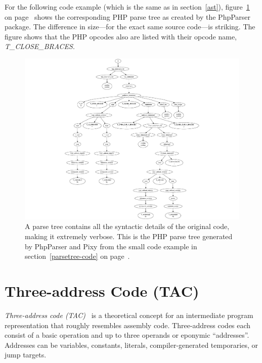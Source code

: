 For the following code example (which is the same as in section~\ref{ast}), figure~\ref{fig:parse-tree} on page~\pageref{fig:parse-tree} shows the corresponding PHP parse tree as created by the PhpParser package. The difference in size---for the exact same source code---is striking. The figure shows that the PHP opcodes also are listed with their opcode name, \eg \emph{T\_CLOSE\_BRACES}.

\label{parsetree-code}

\begin{figure}[htb]
  \begin{center}
    \includegraphics[scale=0.84, trim=54mm 0mm 0mm 0mm]{images/parse-tree}
    \caption{A parse tree contains all the syntactic details of the original code, making it extremely verbose. This is the PHP parse tree generated by PhpParser and Pixy from the small code example in section~\ref{parsetree-code} on page~\pageref{parsetree-code}.}
    \label{fig:parse-tree}
  \end{center}
\end{figure}



\section{Three-address Code (TAC)}
\label{tac}

\emph{Three-address code (TAC)}~\cite{compiler-construction, compilers} is a theoretical concept for an intermediate program representation that roughly resembles assembly code. Three-address codes each consist of a basic operation and up to three operands or eponymic ``addresses''. Addresses can be variables, constants, literals, compiler-generated temporaries, or jump targets.

